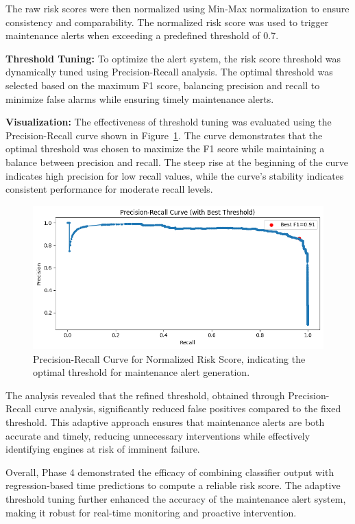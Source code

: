 \documentclass[conference]{IEEEtran}
\begin{document}
The raw risk scores were then normalized using Min-Max normalization to ensure consistency and comparability. The normalized risk score was used to trigger maintenance alerts when exceeding a predefined threshold of 0.7.

\textbf{Threshold Tuning:} To optimize the alert system, the risk score threshold was dynamically tuned using Precision-Recall analysis. The optimal threshold was selected based on the maximum F1 score, balancing precision and recall to minimize false alarms while ensuring timely maintenance alerts.

\textbf{Visualization:} The effectiveness of threshold tuning was evaluated using the Precision-Recall curve shown in Figure~\ref{fig:pr_curve}. The curve demonstrates that the optimal threshold was chosen to maximize the F1 score while maintaining a balance between precision and recall. The steep rise at the beginning of the curve indicates high precision for low recall values, while the curve's stability indicates consistent performance for moderate recall levels.

\begin{figure}[h]
    \centering
    \includegraphics[width=0.8\linewidth]{phase_4_pre_rec_curve_w_f1.png}
    \caption{Precision-Recall Curve for Normalized Risk Score, indicating the optimal threshold for maintenance alert generation.}
    \label{fig:pr_curve}
\end{figure}

The analysis revealed that the refined threshold, obtained through Precision-Recall curve analysis, significantly reduced false positives compared to the fixed threshold. This adaptive approach ensures that maintenance alerts are both accurate and timely, reducing unnecessary interventions while effectively identifying engines at risk of imminent failure.

Overall, Phase 4 demonstrated the efficacy of combining classifier output with regression-based time predictions to compute a reliable risk score. The adaptive threshold tuning further enhanced the accuracy of the maintenance alert system, making it robust for real-time monitoring and proactive intervention.
\end{document}
